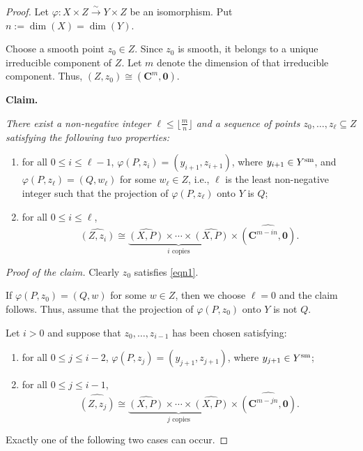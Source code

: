 \documentclass[english,10pt,reqno,twoside]{amsart}
\numberwithin{equation}{section}
\numberwithin{figure}{section}
\theoremstyle{plain}
\theoremstyle{plain}
\theoremstyle{definition}
\theoremstyle{plain}
\numberwithin{equation}{section}
\newcommand{\C}{\mathbf{C}}
\newcommand{\oo}{\mathbf{0}}
\begin{document}
\begin{proof}
Let $\varphi:X\times Z \xrightarrow{\sim} Y\times Z$ be an isomorphism. Put $n:=\dim(X)=\dim(Y)$.

Choose a smooth point $z_0\in Z$. Since $z_0$ is smooth, it belongs to a unique irreducible component of $Z$. Let $m$ denote the dimension of that irreducible component. Thus, $(Z,z_0)\cong (\C^m,\oo)$.

\medskip
\textbf{Claim.} {\it There exist a non-negative integer $\ell \leq \lfloor \frac{m}{n}\rfloor$ and a sequence of points ${z_0,\ldots,z_\ell}\subseteq Z$ satisfying the following two properties:
\begin{enumerate}[\indent\rm(1)]
\item for all $0\leq i\leq \ell-1$, $\varphi(P,z_i)=(y_{i+1},z_{i+1})$, where $y_{i+1}\in Y^{\rm sm}$, and $\varphi(P,z_\ell)=(Q,w_\ell)$ for some $w_\ell\in Z$, i.e., $\ell$ is the least non-negative integer such that the projection of $\varphi(P,z_\ell)$ onto $Y$ is $Q$;

\item for all $0\leq i\leq \ell$,
\begin{equation}\label{eqn1}
\widehat{(Z,z_i)}
\cong
\underbrace{\widehat{(X,P)}\times \cdots \times \widehat{(X,P)}}_{i\text{ copies}}
\times
\widehat{(\C^{m-in},\oo)}.
\end{equation}
\end{enumerate}
}

\smallskip

\textit{Proof of the claim.}
Clearly $z_0$ satisfies \eqref{eqn1}.

If $\varphi(P,z_0)=(Q,w)$ for some $w\in Z$, then we choose $\ell=0$ and the claim follows. Thus, assume that the projection of $\varphi(P,z_0)$ onto $Y$ is not $Q$.

Let $i>0$ and suppose that ${z_0,\ldots,z_{i-1}}$ has been chosen satisfying:

\begin{enumerate}[\indent\rm(1)]
\item for all $0\leq j\leq i-2$, $\varphi(P,z_j)=(y_{j+1},z_{j+1})$, where $y_{j+1}\in Y^{\rm sm}$;

\item for all $0\leq j\leq i-1$,
\[
\widehat{(Z,z_j)}
\cong
\underbrace{\widehat{(X,P)}\times \cdots \times \widehat{(X,P)}}_{j\text{ copies}}
\times
\widehat{(\C^{m-jn},\oo)}.
\]
\end{enumerate}

Exactly one of the following two cases can occur.


\end{proof}
\end{document}
